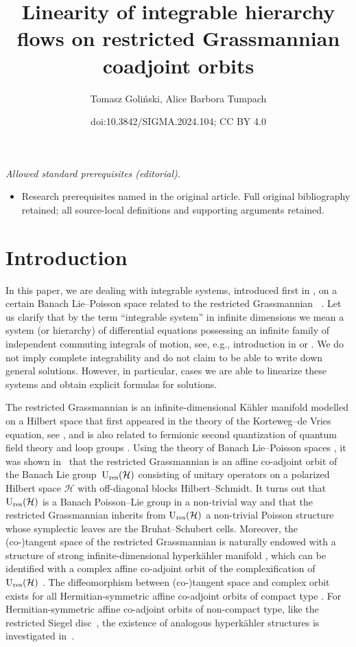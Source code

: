 \documentclass[10pt,a4paper]{amsart}
\title{Linearity of integrable hierarchy flows on restricted Grassmannian coadjoint orbits}
\author{Tomasz Goliński, Alice Barbora Tumpach}
\date{doi:10.3842/SIGMA.2024.104; CC BY 4.0}
\theoremstyle{definition}
\numberwithin{equation}{section}
\renewcommand{\H}{\mathcal{H}}
\DeclareMathOperator{\Gr}{Gr_{res}(\H,\H_+)}
\newcommand{\Ur}{\mathrm{U}_{\textnormal{res}}(\H)}
\begin{document}
\maketitle
\noindent\textit{Allowed standard prerequisites (editorial).}\begin{itemize}
\item Research prerequisites named in the original article. Full original bibliography retained; all source-local definitions and supporting arguments retained.
\end{itemize}\medskip
\section{Introduction}

In this paper, we are dealing with integrable systems, introduced first in \cite{GO-grass}, on a certain Banach Lie--Poisson space related to the restricted Grassmannian $\Gr$. Let us clarify that by the term ``integrable system'' in infinite dimensions we mean a system (or hierarchy) of differential equations possessing an infinite family of independent commuting integrals of motion, see, e.g., introduction in \cite{hitchin-segal-ward} or \cite{bolsinov-na4}. We do not imply complete integrability and do not claim to be able to write down general solutions.
However, in particular, cases we are able to linearize these systems and obtain explicit formulas for solutions.

The restricted Grassmannian is an infinite-dimensional K\"ahler manifold modelled on a Hilbert space that first appeared in the theory of the Korteweg--de Vries equation, see \cite{sato-sato,segal-wilson}, and is also related to fermionic second quantization of quantum field theory \cite{chiumiento24,mickelsson,wurzbacher} and loop groups \cite{segal, segal-wilson}. Using the theory of Banach Lie--Poisson spaces \cite{OR, Oext}, it was shown in~\cite{Ratiu-grass} that the restricted Grassmannian is an affine co-adjoint orbit of the Banach Lie group~$\Ur$ consisting of unitary operators on a polarized Hilbert space $\mathcal{H}$ with off-diagonal blocks Hilbert--Schmidt. It turns out that $\Ur$ is a Banach Poisson--Lie group in a non-trivial way \cite{tumpach-bruhat} and that the restricted Grassmannian inherits from $\Ur$ a non-trivial Poisson structure whose symplectic leaves are the Bruhat--Schubert cells.
Moreover, the (co-)tangent space of the restricted Grassmannian is naturally endowed with a structure of strong infinite-dimensional hyperk\"ahler manifold \cite{tumpach-hyperkahler}, which can be identified with a complex affine co-adjoint orbit of the complexification of $\Ur$ \cite{tumpach-hyperkaehler2}. The diffeomorphism between (co-)tangent space and complex orbit exists for all Hermitian-symmetric affine co-adjoint orbits of compact type \cite{tumpach-hyperkaehler2,tumpach-classification}. For Hermitian-symmetric affine co-adjoint orbits of non-compact type, like the restricted Siegel disc~\cite{T-siegel}, the existence of analogous hyperk\"ahler structures is investigated in~\cite{GBRT-hyperkaehler}.
\end{document}
